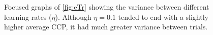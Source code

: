 \documentclass[letterpaper, 11 pt]{article}
\begin{document}
\begin{figure}[bt]
	\vspace{-2 cm}
	\centering
	\caption{	Focused graphs of \ref{fig:eTr} showing the variance between different
				learning rates ($\eta$). Although $\eta=0.1$ tended to end with a
				slightly higher average CCP, it had much greater variance between trials.
			}
	\label{fig:e1ex}
\end{figure}
\end{document}
